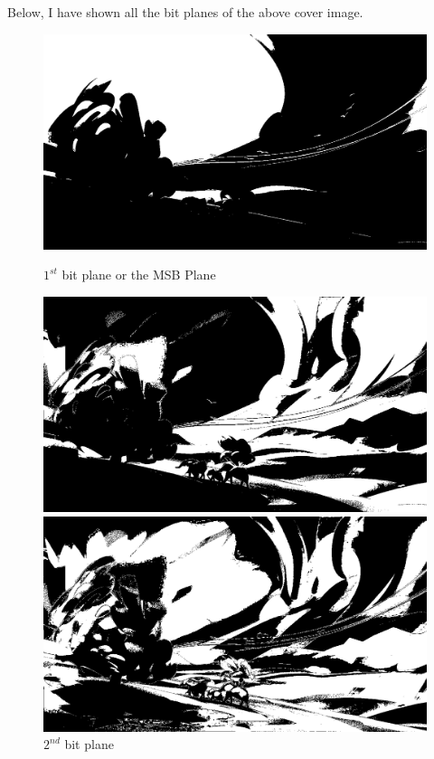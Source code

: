\documentclass{report}
\begin{document}
\par Below, I have shown all the bit planes of the above cover image.
\begin{figure}[H]
\centering
\begin{minipage}{0.46\linewidth}
\includegraphics[width=\textwidth]{images/1.png}
\caption{$1^{st}$ bit plane or the MSB Plane}
\end{minipage}
\hfill
\begin{minipage}{0.46\linewidth}
\includegraphics[width=\textwidth]{images/2.png}
\caption{$2^{nd}$ bit plane}
\end{minipage}
\vfill
\begin{minipage}{0.46\linewidth}
\includegraphics[width=\textwidth]{images/3.png}

\end{minipage}
\end{figure}
\end{document}
